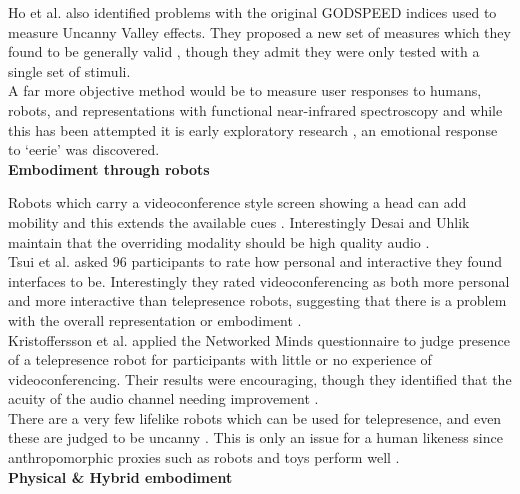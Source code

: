                     Ho et al. also identified problems with the original GODSPEED indices used to measure Uncanny Valley effects. They proposed a new set of measures which they found to be generally valid \cite{Ho:2010:RUV:1853385.1853509}, though they admit they were only tested with a single set of stimuli.\\
                    A far more objective method would be to measure user responses to humans, robots, and representations with functional near-infrared spectroscopy and while this has been attempted it is early exploratory research \cite{Strait2014}, an emotional response to `eerie' was discovered.\\
\textbf{Embodiment through robots}

                    Robots which carry a videoconference style screen showing a head can add mobility and this extends the available cues \cite{Adalgeirsson2010, Lee2011b, Tsui2011, Paulos1998, Kristoffersson2013}. Interestingly Desai and Uhlik maintain that the overriding modality should be high quality audio \cite{Desai2011}.\\
                    Tsui et al. asked 96 participants to rate how personal and interactive they found interfaces to be. Interestingly they rated videoconferencing as both more personal and more interactive than telepresence robots, suggesting that there is a problem with the overall representation or embodiment \cite{Tsui2012}.\\
                    Kristoffersson et al. applied the Networked Minds questionnaire to judge presence of a telepresence robot for participants with little or no experience of videoconferencing. Their results were encouraging, though they identified that the acuity of the audio channel needing improvement \cite{Kristoffersson2011}.\\
                    There are a very few lifelike robots which can be used for telepresence, and even these are judged to be uncanny \cite{Sakamoto2007}. This is only an issue for a human likeness since anthropomorphic proxies such as robots and toys perform well \cite{Mori1970}.\\
 \textbf{Physical \& Hybrid embodiment}
 
